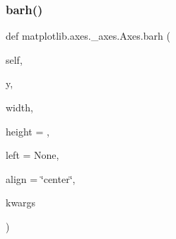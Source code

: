 \begin{DoxyVerb}%
\end{DoxyVerb}
 \mbox{\label{classmatplotlib_1_1axes_1_1__axes_1_1Axes_a33485675479b57029c75b3ecd0f65d98}} 
\subsubsection{\texorpdfstring{barh()}{barh()}}
{\footnotesize\ttfamily def matplotlib.\+axes.\+\_\+axes.\+Axes.\+barh (\begin{DoxyParamCaption}\item[{}]{self,  }\item[{}]{y,  }\item[{}]{width,  }\item[{}]{height = {},  }\item[{}]{left = {\ttfamily None},  }\item[{}]{align = {\ttfamily \char`\"{}center\char`\"{}},  }\item[{}]{kwargs }\end{DoxyParamCaption})}

